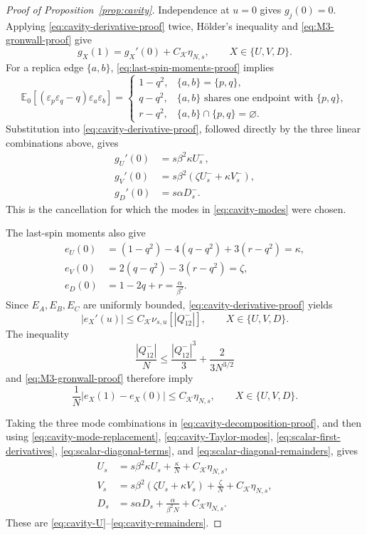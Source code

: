 \documentclass[11pt]{article}
\numberwithin{equation}{section}
\newcommand{\1}{\mathbf 1}
\newcommand{\cK}{\mathcal K}
\begin{document}
\begin{proof}[Proof of Proposition~\ref{prop:cavity}]
Independence at $u=0$ gives $g_j(0)=0$.  Applying
\eqref{eq:cavity-derivative-proof} twice, H\"older's inequality and
\eqref{eq:M3-gronwall-proof} give
\begin{equation}
 g_X(1)=g_X'(0)+C_{\cK}\eta_{N,s},
 \qquad X\in\{U,V,D\}.
 \label{eq:cavity-Taylor-modes}
\end{equation}
For a replica edge $\{a,b\}$, \eqref{eq:last-spin-moments-proof}
implies
\begin{equation}
 \mathbb E_0[(\varepsilon_p\varepsilon_q-q)
 \varepsilon_a\varepsilon_b]
 =
 \begin{cases}
 1-q^2,&\{a,b\}=\{p,q\},\\
 q-q^2,&\{a,b\}\text{ shares one endpoint with }\{p,q\},\\
 r-q^2,&\{a,b\}\cap\{p,q\}=\varnothing.
 \end{cases}
 \label{eq:edge-rule-proof}
\end{equation}
Substitution into \eqref{eq:cavity-derivative-proof}, followed directly
by the three linear combinations above, gives
\begin{align}
 g_U'(0)&=s\beta^2\kappa  U_s^-,\nonumber\\
 g_V'(0)&=s\beta^2(\zeta U_s^-+\kappa V_s^-),
 \label{eq:scalar-first-derivatives}\\
 g_D'(0)&=s\alpha D_s^- .\nonumber
\end{align}
This is the cancellation for which the modes in
\eqref{eq:cavity-modes} were chosen.

The last-spin moments also give
\begin{align}
 e_U(0)&=(1-q^2)-4(q-q^2)+3(r-q^2)=\kappa ,\nonumber\\
 e_V(0)&=2(q-q^2)-3(r-q^2)=\zeta,
 \label{eq:scalar-diagonal-terms}\\
 e_D(0)&=1-2q+r=\frac{\alpha}{\beta^2}.
 \nonumber
\end{align}
Since $E_A,E_B,E_C$ are uniformly bounded,
\eqref{eq:cavity-derivative-proof} yields
\[
 |e_X'(u)|\le C_{\cK}\nu_{s,u}[|Q^-_{12}|],
 \qquad X\in\{U,V,D\}.
\]
The inequality
\[
 \frac{|Q^-_{12}|}{N}
 \le\frac{|Q^-_{12}|^3}{3}+\frac{2}{3N^{3/2}}
\]
and \eqref{eq:M3-gronwall-proof} therefore imply
\begin{equation}
 \frac1N|e_X(1)-e_X(0)|
 \le C_{\cK}\eta_{N,s},
 \qquad X\in\{U,V,D\}.
 \label{eq:scalar-diagonal-remainders}
\end{equation}

Taking the three mode combinations in
\eqref{eq:cavity-decomposition-proof}, and then using
\eqref{eq:cavity-mode-replacement},
\eqref{eq:cavity-Taylor-modes}, \eqref{eq:scalar-first-derivatives},
\eqref{eq:scalar-diagonal-terms}, and
\eqref{eq:scalar-diagonal-remainders}, gives
\begin{align*}
 U_s&=s\beta^2\kappa U_s+\frac{\kappa }N
 +C_{\cK}\eta_{N,s},\\
 V_s&=s\beta^2(\zeta U_s+\kappa V_s)+\frac{\zeta}N
 +C_{\cK}\eta_{N,s},\\
 D_s&=s\alpha D_s+\frac{\alpha}{\beta^2N}
 +C_{\cK}\eta_{N,s}.
\end{align*}
These are \eqref{eq:cavity-U}--\eqref{eq:cavity-remainders}.
\end{proof}
\end{document}
